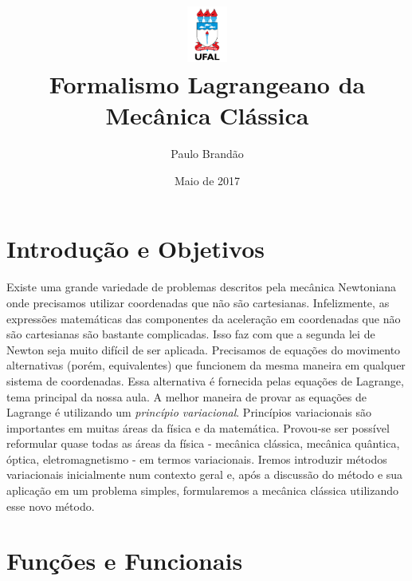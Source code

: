 \documentclass{article}
\title{\includegraphics[width=0.1\textwidth]{ufallogo.png} \\\Huge{\color{astral}\textbf{Formalismo Lagrangeano da Mecânica Clássica}}}
\author{Paulo Brandão}
\date{Maio de 2017}
\begin{document}
\maketitle

\section{Introdução e Objetivos}

Existe uma grande variedade de problemas descritos pela mecânica Newtoniana onde precisamos utilizar coordenadas que não são cartesianas. Infelizmente, as expressões matemáticas das componentes da aceleração em coordenadas que não são cartesianas são bastante complicadas. Isso faz com que a segunda lei de Newton seja muito difícil de ser aplicada. Precisamos de equações do movimento alternativas (porém, equivalentes) que funcionem da mesma maneira em qualquer sistema de coordenadas. Essa alternativa é fornecida pelas equações de Lagrange, tema principal da nossa aula. A melhor maneira de provar as equações de Lagrange é utilizando um \textit{princípio variacional}. Princípios variacionais são importantes em muitas áreas da física e da matemática. Provou-se ser possível reformular quase todas as áreas da física - mecânica clássica, mecânica quântica, óptica, eletromagnetismo - em termos variacionais. Iremos introduzir métodos variacionais inicialmente num contexto geral e, após a discussão do método e sua aplicação em um problema simples, formularemos a mecânica clássica utilizando esse novo método.

\section{Funções e Funcionais}
\end{document}
